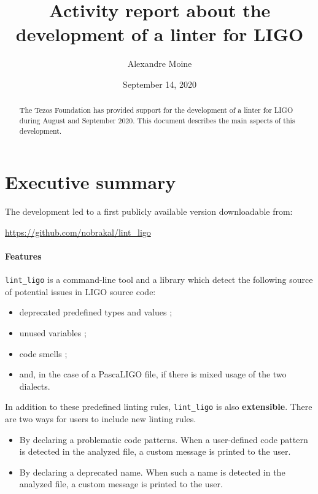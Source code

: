 \documentclass[10pt,a4paper]{article}
\author{Alexandre Moine}
\title{Activity report about the development of a linter for LIGO}
\date{September 14, 2020}
\begin{document}
\maketitle

\begin{abstract}
  The Tezos Foundation has provided support for the
  development of a linter for LIGO during August and September
  2020. This document describes the main aspects of this development.
\end{abstract}

\section{Executive summary}

The development led to a first publicly available version downloadable from:
\begin{center}
  \url{https://github.com/nobrakal/lint\_ligo}
\end{center}

\paragraph{Features}

\verb|lint_ligo| is a command-line tool and a library which detect
the following source of potential issues in LIGO source code:

\begin{itemize}
\item deprecated predefined types and values ;
\item unused variables ;
\item code smells ;
\item and, in the case of a PascaLIGO file, if there is mixed usage of the two dialects.
\end{itemize}

In addition to these predefined linting rules, \verb!lint_ligo! is
also \textbf{extensible}. There are two ways for users to include new
linting rules.

\begin{itemize}
\item
  By declaring a problematic code patterns. When a user-defined code pattern is detected in
  the analyzed file, a custom message is printed to the user.

\item
  By declaring a deprecated name. When such a name is detected
  in the analyzed file, a custom message is printed to the user.
\end{itemize}
\end{document}

